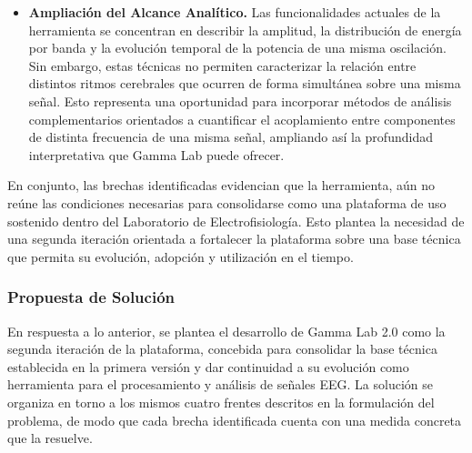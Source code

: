 \documentclass[12pt,letterpaper,oneside]{article}
\begin{document}
\begin{itemize}
  \item \textbf{Ampliación del Alcance Analítico.} Las funcionalidades actuales de la herramienta se concentran en describir la amplitud, la distribución de energía por banda y la evolución temporal de la potencia de una misma oscilación. Sin embargo, estas técnicas no permiten caracterizar la relación entre distintos ritmos cerebrales que ocurren de forma simultánea sobre una misma señal. Esto representa una oportunidad para incorporar métodos de análisis complementarios orientados a cuantificar el acoplamiento entre componentes de distinta frecuencia de una misma señal, ampliando así la profundidad interpretativa que Gamma Lab puede ofrecer.
\end{itemize}

En conjunto, las brechas identificadas evidencian que la herramienta, aún no reúne las condiciones necesarias para consolidarse como una plataforma de uso sostenido dentro del Laboratorio de Electrofisiología. Esto plantea la necesidad de una segunda iteración orientada a fortalecer la plataforma sobre una base técnica que permita su evolución, adopción y utilización en el tiempo.

\subsubsection{Propuesta de Solución}

En respuesta a lo anterior, se plantea el desarrollo de Gamma Lab 2.0 como la segunda iteración de la plataforma, concebida para consolidar la base técnica establecida en la primera versión y dar continuidad a su evolución como herramienta para el procesamiento y análisis de señales EEG. La solución se organiza en torno a los mismos cuatro frentes descritos en la formulación del problema, de modo que cada brecha identificada cuenta con una medida concreta que la resuelve.
\end{document}
